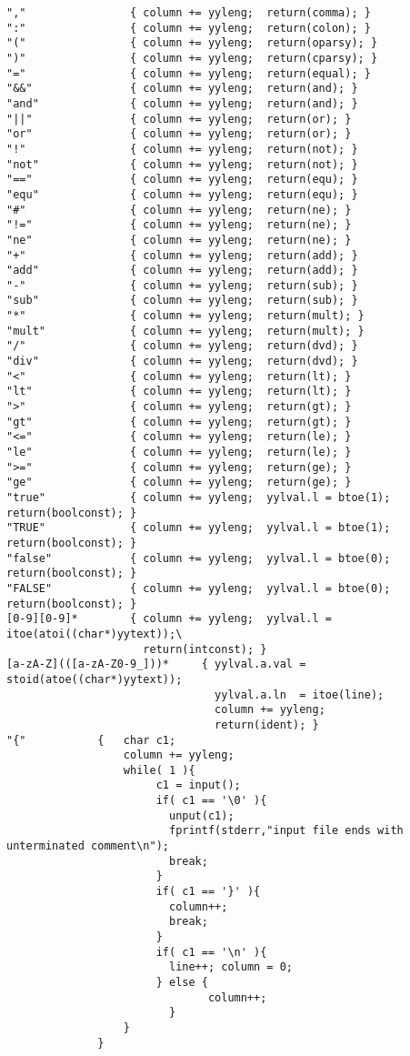 \begin{verbatim}
","                { column += yyleng;  return(comma); }
":"                { column += yyleng;  return(colon); }
"("                { column += yyleng;  return(oparsy); }
")"                { column += yyleng;  return(cparsy); }
"="                { column += yyleng;  return(equal); }
"&&"               { column += yyleng;  return(and); }
"and"              { column += yyleng;  return(and); }
"||"               { column += yyleng;  return(or); }
"or"               { column += yyleng;  return(or); }
"!"                { column += yyleng;  return(not); }
"not"              { column += yyleng;  return(not); }
"=="               { column += yyleng;  return(equ); }
"equ"              { column += yyleng;  return(equ); }
"#"                { column += yyleng;  return(ne); }
"!="               { column += yyleng;  return(ne); }
"ne"               { column += yyleng;  return(ne); }
"+"                { column += yyleng;  return(add); }
"add"              { column += yyleng;  return(add); }
"-"                { column += yyleng;  return(sub); }
"sub"              { column += yyleng;  return(sub); }
"*"                { column += yyleng;  return(mult); }
"mult"             { column += yyleng;  return(mult); }
"/"                { column += yyleng;  return(dvd); }
"div"              { column += yyleng;  return(dvd); }
"<"                { column += yyleng;  return(lt); }
"lt"               { column += yyleng;  return(lt); }
">"                { column += yyleng;  return(gt); }
"gt"               { column += yyleng;  return(gt); }
"<="               { column += yyleng;  return(le); }
"le"               { column += yyleng;  return(le); }
">="               { column += yyleng;  return(ge); }
"ge"               { column += yyleng;  return(ge); }
"true"             { column += yyleng;  yylval.l = btoe(1);  return(boolconst); }
"TRUE"             { column += yyleng;  yylval.l = btoe(1);  return(boolconst); }
"false"            { column += yyleng;  yylval.l = btoe(0);  return(boolconst); }
"FALSE"            { column += yyleng;  yylval.l = btoe(0);  return(boolconst); }
[0-9][0-9]*        { column += yyleng;  yylval.l = itoe(atoi((char*)yytext));\
                     return(intconst); }
[a-zA-Z](([a-zA-Z0-9_]))*     { yylval.a.val = stoid(atoe((char*)yytext));
                                yylval.a.ln  = itoe(line);
                                column += yyleng;  
                                return(ident); }
"{"           {   char c1;
                  column += yyleng;
                  while( 1 ){
                       c1 = input();
                       if( c1 == '\0' ){
                         unput(c1);
                         fprintf(stderr,"input file ends with unterminated comment\n");
                         break;
                       }
                       if( c1 == '}' ){
                         column++;
                         break;
                       }
                       if( c1 == '\n' ){
                         line++; column = 0;
                       } else {
                               column++;
                         }
                  }
              }

\end{verbatim}

